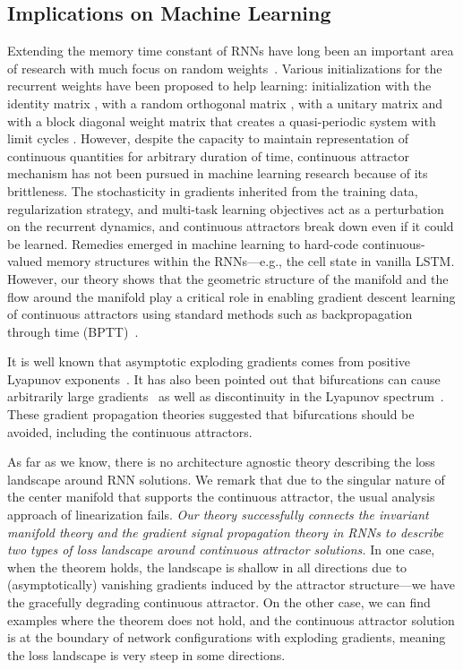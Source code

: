 \documentclass{article}
\newcounter{ct}
\theoremstyle{definition}
\theoremstyle{remark}
\begin{document}
\subsection{Implications on Machine Learning}\label{sec:imp:ML}
Extending the memory time constant of RNNs have long been an important area of research with much focus on random weights~\cite{Legenstein2007,Goldman2009,Toyoizumi2011,Kerg2019,Chen2018,Henaff2016,Rusch2021,arjovskyUnitaryEvolutionRecurrent2016}.
Various initializations for the recurrent weights have been proposed to help learning: initialization with the identity matrix \citep{le2015}, with a random orthogonal matrix \citep{saxeExactSolutionsNonlinear2014,Henaff2016}, with a unitary matrix \citep{arjovskyUnitaryEvolutionRecurrent2016} and with a block diagonal weight matrix that creates a quasi-periodic system with limit cycles \citep{Sokol2019a}.
However, despite the capacity to maintain representation of continuous quantities for arbitrary duration of time, continuous attractor mechanism has not been pursued in machine learning research because of its brittleness.
The stochasticity in gradients inherited from the training data, regularization strategy, and multi-task learning objectives act as a perturbation on the recurrent dynamics, and continuous attractors break down even if it could be learned.
Remedies emerged in machine learning to hard-code continuous-valued memory structures within the RNNs---e.g., the cell state in vanilla LSTM.
However, our theory shows that the geometric structure of the manifold and the flow around the manifold play a critical role in enabling gradient descent learning of continuous attractors using standard methods such as backpropagation through time (BPTT)~\cite{Toomarian1991}.

It is well known that asymptotic exploding gradients comes from positive Lyapunov exponents~\cite{Mikhaeil2022,Vogt2022,Engelken2023}.
It has also been pointed out that bifurcations can cause arbitrarily large gradients~\cite{doya1993} as well as discontinuity in the Lyapunov spectrum~\cite{Park2023a}.
These gradient propagation theories suggested that bifurcations should be avoided, including the continuous attractors.

As far as we know, there is no architecture agnostic theory describing the loss landscape around RNN solutions.
We remark that due to the singular nature of the center manifold that supports the continuous attractor, the usual analysis approach of linearization fails.
\emph{Our theory successfully connects the invariant manifold theory and the gradient signal propagation theory in RNNs to describe two types of loss landscape around continuous attractor solutions.}
In one case, when the theorem holds, the landscape is shallow in all directions due to (asymptotically) vanishing gradients induced by the attractor structure---we have the gracefully degrading continuous attractor.
On the other case, we can find examples where the theorem does not hold, and the continuous attractor solution is at the boundary of network configurations with exploding gradients, meaning the loss landscape is very steep in some directions.
\end{document}
